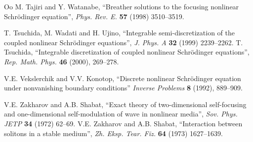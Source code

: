 \documentclass{article}
\begin{document}
\begin{thebibliography}{Oo}
 M. Tajiri and Y. Watanabe, ``Breather solutions to the focusing nonlinear Schr\"odinger equation'', \textit{Phys. Rev. E.} \textbf{57} (1998) 3510--3519. 

 T. Tsuchida, M. Wadati and H. Ujino, ``Integrable semi-discretization of the coupled nonlinear Schr\"odinger equations'', \textit{J. Phys. A} \textbf{32} (1999) 2239--2262.
 T. Tsuchida, ``Integrable discretization of coupled nonlinear Schr\"odinger equations'', \textit{Rep. Math. Phys.} \textbf{46} (2000), 269--278.

  V.E. Vekslerchik and V.V. Konotop, ``Discrete nonlinear Schr\"odinger equation under nonvanishing boundary conditions'' \textit{Inverse Problems} \textbf{8} (1992), 889--909.

 V.E. Zakharov and A.B. Shabat, ``Exact theory of two-dimensional self-focusing and one-dimensional self-modulation of wave in nonlinear media'', \textit{Sov. Phys. JETP} \textbf{34} (1972) 62--69.
 V.E. Zakharov and A.B. Shabat, ``Interaction between solitons in a stable medium'', \textit{Zh. Eksp. Tear. Fiz.} \textbf{64} (1973) 1627--1639.
\end{thebibliography}
\end{document}
